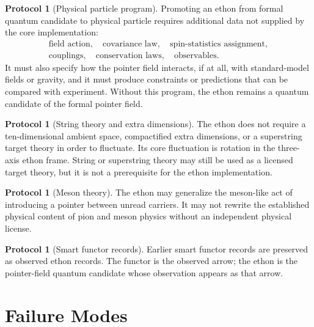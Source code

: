 \documentclass[11pt]{article}
\theoremstyle{definition}
\newtheorem{protocol}[definition]{Protocol}
\theoremstyle{plain}
\begin{document}
\begin{protocol}[Physical particle program]
Promoting an ethon from formal quantum candidate to physical particle
requires additional data not supplied by the core implementation:
\[
  \begin{gathered}
  \text{field action},\quad
  \text{covariance law},\quad
  \text{spin-statistics assignment},\\
  \text{couplings},\quad
  \text{conservation laws},\quad
  \text{observables}.
  \end{gathered}
\]
It must also specify how the pointer field interacts, if at all, with
standard-model fields or gravity, and it must produce constraints or
predictions that can be compared with experiment.  Without this program,
the ethon remains a quantum candidate of the formal pointer field.
\end{protocol}

\begin{protocol}[String theory and extra dimensions]
The ethon does not require a ten-dimensional ambient space, compactified
extra dimensions, or a superstring target theory in order to fluctuate.
Its core fluctuation is rotation in the three-axis ethon frame.  String
or superstring theory may still be used as a licensed target theory, but
it is not a prerequisite for the ethon implementation.
\end{protocol}

\begin{protocol}[Meson theory]
The ethon may generalize the meson-like act of introducing a pointer
between unread carriers.  It may not rewrite the established physical
content of pion and meson physics without an independent physical
license.
\end{protocol}

\begin{protocol}[Smart functor records]
Earlier smart functor records are preserved as observed ethon records.
The functor is the observed arrow; the ethon is the pointer-field quantum
candidate whose observation appears as that arrow.
\end{protocol}

\section{Failure Modes}
\end{document}
